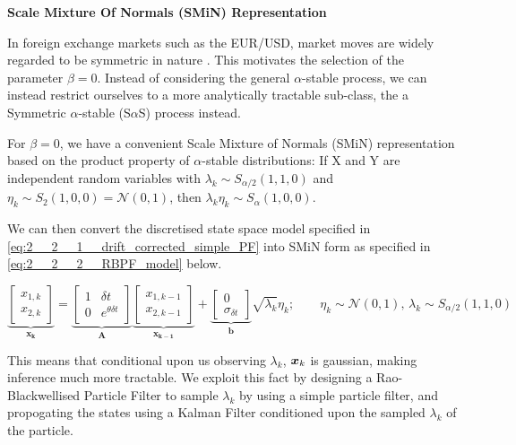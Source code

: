\documentclass[../main.tex]{subfiles}
\begin{document}
\textbf{Scale Mixture Of Normals (SMiN) Representation}

In foreign exchange markets such as the EUR/USD, market moves are widely regarded to be symmetric in nature \cite{tankov2003financial}. This motivates the selection of the parameter $\beta = 0$. Instead of considering the general $\alpha$-stable process, we can instead restrict ourselves to a more analytically tractable sub-class, the a Symmetric $\alpha$-stable (S$\alpha$S) process instead.

For $\beta = 0$, we have a convenient Scale Mixture of Normals (SMiN) representation based on the product property of $\alpha$-stable distributions: If X and Y are independent random variables with $\lambda_k \sim S_{\alpha/2}(1, 1, 0)$ and $\eta_k \sim S_2(1,0,0) = \mathcal{N}(0,1)$, then $\lambda_k \eta_k \sim S_\alpha(1, 0, 0)$.

We can then convert the discretised state space model specified in \autoref{eq:2__2__1__drift_corrected_simple_PF} into SMiN form as specified in \autoref{eq:2__2__2__RBPF_model} below.

\begin{equation}
    \underbrace{
        \begin{bmatrix}
        x_{1,k} \\ x_{2,k}
        \end{bmatrix}
    }_{\mathbf{x_{k}}}
    =
    \underbrace{
        \begin{bmatrix}
        1 & \delta t \\ 0 & e^{\theta \delta t}
        \end{bmatrix}
    }_{\mathbf{A}}
    \underbrace{
        \begin{bmatrix}
        x_{1,k-1} \\ x_{2,k-1}
        \end{bmatrix}
    }_{\mathbf{x_{k-1}}}
    + 
    \underbrace{
        \begin{bmatrix}
        0 \\ \sigma_{\delta t}
        \end{bmatrix}
    }_{\mathbf{b}} \sqrt{\lambda_{k}} \eta_{k} ;
    \qquad \eta_{k} \sim \mathcal{N}(0,1) \text{,   } \lambda_{k} \sim S_{\alpha/2}(1,1,0)
    \label{eq:2__2__2__RBPF_model}
\end{equation}

This means that conditional upon us observing $\lambda_{k}$, $\bm{x}_{k}$ is gaussian, making inference much more tractable. We exploit this fact by designing a Rao-Blackwellised Particle Filter to sample $\lambda_{k}$ by using a simple particle filter, and propogating the states using a Kalman Filter conditioned upon the sampled $\lambda_{k}$ of the particle. 
\end{document}
